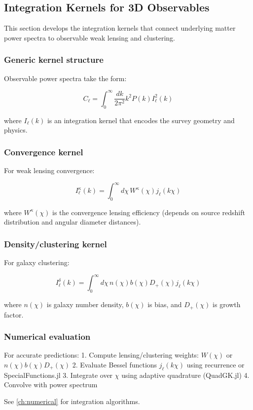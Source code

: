 \subsection{Integration Kernels for 3D Observables}\label{subsec:obs_sfb_kernels}

This section develops the integration kernels that connect underlying matter power spectra to observable weak lensing and clustering.

\subsubsection{Generic kernel structure}

Observable power spectra take the form:

\begin{equation}
C_\ell = \int_0^\infty \frac{dk}{2\pi^2} k^2 P(k) I^2_\ell(k)
\end{equation}

where $I_\ell(k)$ is an integration kernel that encodes the survey geometry and physics.

\subsubsection{Convergence kernel}

For weak lensing convergence:

\begin{equation}
I^{\kappa}_\ell(k) = \int_0^\infty d\chi \, W^\kappa(\chi) j_\ell(k\chi)
\end{equation}

where $W^\kappa(\chi)$ is the convergence lensing efficiency (depends on source redshift distribution and angular diameter distances).

\subsubsection{Density/clustering kernel}

For galaxy clustering:

\begin{equation}
I^{\delta}_\ell(k) = \int_0^\infty d\chi \, n(\chi) b(\chi) D_+(\chi) j_\ell(k\chi)
\end{equation}

where $n(\chi)$ is galaxy number density, $b(\chi)$ is bias, and $D_+(\chi)$ is growth factor.

\subsubsection{Numerical evaluation}

For accurate predictions:
1. Compute lensing/clustering weights: $W(\chi)$ or $n(\chi) b(\chi) D_+(\chi)$
2. Evaluate Bessel functions $j_\ell(k\chi)$ using recurrence or SpecialFunctions.jl
3. Integrate over $\chi$ using adaptive quadrature (QuadGK.jl)
4. Convolve with power spectrum

See \cref{ch:numerical} for integration algorithms.
